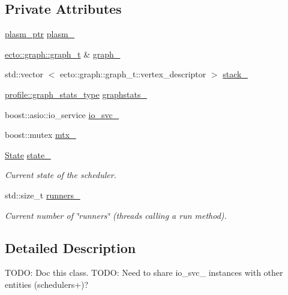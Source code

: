 \subsection*{\-Private \-Attributes}
\begin{DoxyCompactItemize}
\item 
\hyperlink{namespaceecto_a6b83be6cd685db71f03b14871653475f}{plasm\-\_\-ptr} \hyperlink{classecto_1_1scheduler_a9ccfb508a5bf75ec7ca69b475a7c7226}{plasm\-\_\-}
\item 
\hyperlink{structecto_1_1graph_1_1graph__t}{ecto\-::graph\-::graph\-\_\-t} \& \hyperlink{classecto_1_1scheduler_a79de9623f94d1003dc34f12fc69c5981}{graph\-\_\-}
\item 
std\-::vector\*
$<$ ecto\-::graph\-::graph\-\_\-t\-::vertex\-\_\-descriptor $>$ \hyperlink{classecto_1_1scheduler_ad2b6561ebc08afd8cf8edaa39cb702b8}{stack\-\_\-}
\item 
\hyperlink{structecto_1_1profile_1_1graph__stats__type}{profile\-::graph\-\_\-stats\-\_\-type} \hyperlink{classecto_1_1scheduler_a6da29ce8fc4f4d2a1c451a577e049c62}{graphstats\-\_\-}
\item 
boost\-::asio\-::io\-\_\-service \hyperlink{classecto_1_1scheduler_af8f90a97a59811157c657cecb8512069}{io\-\_\-svc\-\_\-}
\item 
boost\-::mutex \hyperlink{classecto_1_1scheduler_a47a29f5a0e1f1ab8ce816b0c63442b5c}{mtx\-\_\-}
\item 
\hyperlink{classecto_1_1scheduler_a6b063d1c4bb9dad58d7ace61946b1200}{\-State} \hyperlink{classecto_1_1scheduler_a21d2aac4a8a2ef665942b7c9b741250c}{state\-\_\-}
\begin{DoxyCompactList}\small\item\em \-Current state of the scheduler. \end{DoxyCompactList}\item 
std\-::size\-\_\-t \hyperlink{classecto_1_1scheduler_a650d97445fe90ba4572d208430f71e20}{runners\-\_\-}
\begin{DoxyCompactList}\small\item\em \-Current number of \char`\"{}runners\char`\"{} (threads calling a run method). \end{DoxyCompactList}\end{DoxyCompactItemize}


\subsection{\-Detailed \-Description}
\-T\-O\-D\-O\-: \-Doc this class. \-T\-O\-D\-O\-: \-Need to share io\-\_\-svc\-\_\- instances with other entities (schedulers+)? 

